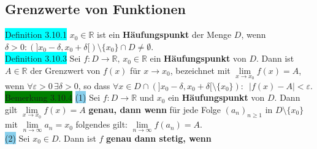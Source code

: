 \documentclass[landscape, 10pt]{article}
\newcommand{\R}{\mathbb{R}}
\begin{document}
\begin{multicols}{3}
       \subsection{Grenzwerte von Funktionen}
              \colorbox{cyan}{Definition 3.10.1}
                     \textcolor{NavyBlue}{$x_0\in\R$} 
                     ist ein \textbf{Häufungspunkt} 
                     der Menge \textcolor{NavyBlue}{$D$}, 
                     wenn \textcolor{NavyBlue}{
                     $\delta>0:(]x_0-\delta,x_0+\delta[)
                     \setminus\{x_0\}\cap D\neq\emptyset$}. \\
              \colorbox{cyan}{Definition 3.10.3}
                     Sei \textcolor{NavyBlue}{$f:D\longrightarrow\R,\,x_0\in\R$}
                     ein \textbf{Häufungspunkt} von \textcolor{NavyBlue}{$D$}.
                     Dann ist \textcolor{NavyBlue}{$A\in\R$} der Grenzwert von 
                     \textcolor{NavyBlue}{$f(x)$} für 
                     \textcolor{NavyBlue}{$x\to x_0$}, 
                     bezeichnet mit 
                     \textcolor{NavyBlue}{$\lim\limits_{x\to x_0}f(x)=A$}, 
                     wenn \textcolor{NavyBlue}{
                     $\forall\varepsilon>0\,\exists\delta>0$}, so dass 
                     \textcolor{NavyBlue}{
                     $\forall x\in D\cap(]x_0-\delta,x_0+\delta[\setminus\{x_0\}):
                     \enspace|f(x)-A|<\varepsilon$}.\\
              \colorbox{green}{Bemerkung 3.10.4} 
                     \colorbox{SkyBlue}{(1)} Sei 
                     \textcolor{NavyBlue}{$f:D\longrightarrow\R$} und 
                            \textcolor{NavyBlue}{$x_0$} ein 
                            \textbf{Häufungspunkt} von $D$. 
                            Dann gilt 
                            \textcolor{NavyBlue}{$\lim\limits_{x\to x_0}f(x)=A$} 
                            \textbf{genau, dann wenn} für jede Folge 
                            \textcolor{NavyBlue}{$(a_n)_{n\geqslant1}$} 
                            in \textcolor{NavyBlue}{$D\setminus\{x_0\}$} mit 
                            \textcolor{NavyBlue}{$\lim\limits_{n\to\infty}a_n=x_0$} 
                            folgendes gilt: 
                            \textcolor{NavyBlue}{
                            $\lim\limits_{n\to\infty}f(a_n)=A$}.\\ 
                     \colorbox{SkyBlue}{(2)}
                            Sei \textcolor{NavyBlue}{$x_0\in D$}. 
                            Dann ist \textcolor{NavyBlue}{$f$} 
                            \textbf{genau dann stetig, wenn} 

\end{multicols}
\end{document}
